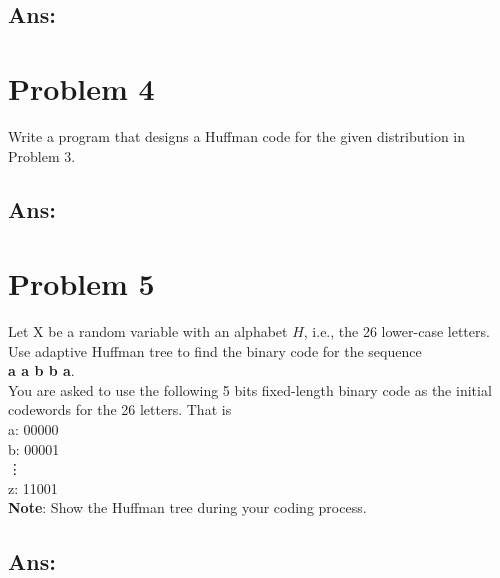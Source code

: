 \documentclass[a4paper, 11pt, oneside]{article} %
\begin{document}
\subsection*{Ans:}

\clearpage

\section*{Problem 4}
Write a program that designs a Huffman code for the given distribution in Problem 3.
\subsection*{Ans:}

\clearpage

\section*{Problem 5}
Let X be a random variable with an alphabet $H$, i.e., the 26 lower-case letters.
Use adaptive Huffman tree to find the binary code for the sequence \\ \textbf{a a b b a}.\\
You are asked to use the following 5 bits fixed-length binary code as the initial codewords for
the 26 letters. That is \\
a: 00000 \\
b: 00001 \\
\vdots \\
z: 11001 \\
\textbf{Note}: Show the Huffman tree during your coding process.
\subsection*{Ans:}
\end{document}
